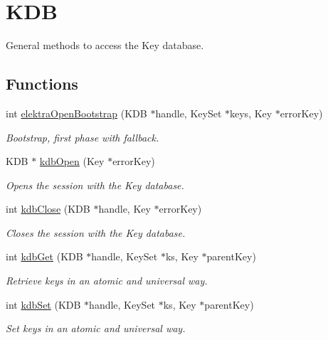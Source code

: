 \hypertarget{group__kdb}{}\section{K\+DB}
\label{group__kdb}


General methods to access the Key database.  


\subsection*{Functions}
\begin{DoxyCompactItemize}
\item 
\mbox{\label{group__kdb_ga5bfaad0230457cd6386032fe65c41576}} 
int \hyperlink{group__kdb_ga5bfaad0230457cd6386032fe65c41576}{elektra\+Open\+Bootstrap} (K\+DB $\ast$handle, Key\+Set $\ast$keys, Key $\ast$error\+Key)
\begin{DoxyCompactList}\small\item\em Bootstrap, first phase with fallback. \end{DoxyCompactList}\item 
K\+DB $\ast$ \hyperlink{group__kdb_ga6808defe5870f328dd17910aacbdc6ca}{kdb\+Open} (Key $\ast$error\+Key)
\begin{DoxyCompactList}\small\item\em Opens the session with the Key database. \end{DoxyCompactList}\item 
int \hyperlink{group__kdb_gadb54dc9fda17ee07deb9444df745c96f}{kdb\+Close} (K\+DB $\ast$handle, Key $\ast$error\+Key)
\begin{DoxyCompactList}\small\item\em Closes the session with the Key database. \end{DoxyCompactList}\item 
int \hyperlink{group__kdb_ga28e385fd9cb7ccfe0b2f1ed2f62453a1}{kdb\+Get} (K\+DB $\ast$handle, Key\+Set $\ast$ks, Key $\ast$parent\+Key)
\begin{DoxyCompactList}\small\item\em Retrieve keys in an atomic and universal way. \end{DoxyCompactList}\item 
int \hyperlink{group__kdb_ga11436b058408f83d303ca5e996832bcf}{kdb\+Set} (K\+DB $\ast$handle, Key\+Set $\ast$ks, Key $\ast$parent\+Key)
\begin{DoxyCompactList}\small\item\em Set keys in an atomic and universal way. \end{DoxyCompactList}\end{DoxyCompactItemize}


